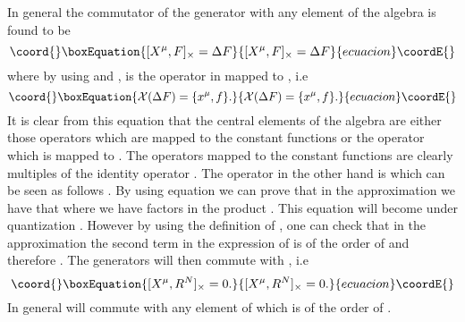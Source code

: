 \documentclass[a4paper,12pt]{article}
\begin{document}
In general the commutator of the generator \coordHE{} with any element \coordHE{} of the algebra \coordHE{} is found to be
\begin{equation}\coord{}\boxEquation{
[X^{\mu},F]_{\times}={\Delta}F
}{
[X^{\mu},F]_{\times}={\Delta}F
}{ecuacion}\coordE{}\end{equation}
where by using \coordHE{} and \coordHE{} , \coordHE{} is the operator
in \coordHE{} mapped to \coordHE{} , i.e
\begin{equation}\coord{}\boxEquation{
{\cal X}({\Delta}F)=\{x^{\mu},f\}.
}{
{\cal X}({\Delta}F)=\{x^{\mu},f\}.
}{ecuacion}\coordE{}\end{equation}
It is clear from this equation that the central elements of the
algebra \coordHE{} are either those operators which are mapped to the
constant functions or the operator \coordHE{} which is mapped to
\coordHE{} . The operators mapped to the constant functions are
clearly multiples of the identity operator \coordHE{} . The
operator \coordHE{} in the other hand is \coordHE{} which can be seen as
follows . By using equation \coordHE{} we can prove that in the
\coordHE{} approximation we have that
\coordHE{}
where we have \coordHE{} factors in the product . This equation will
become under quantization \coordHE{} . However by using
the definition \coordHE{} of \myHighlight{${\Delta}$}\coordHE{} , one can check that in the
\coordHE{} approximation the second term in the expression of
\coordHE{} is of the order of \coordHE{} and therefore \coordHE{} .
The generators \coordHE{} will then commute with \coordHE{} , i.e
\begin{equation}\coord{}\boxEquation{
[X^{\mu},R^{N}]_{\times}=0.
}{
[X^{\mu},R^{N}]_{\times}=0.
}{ecuacion}\coordE{}\end{equation}
In general \coordHE{} will commute with any element of \coordHE{} which is of the order of \coordHE{} .
\end{document}
